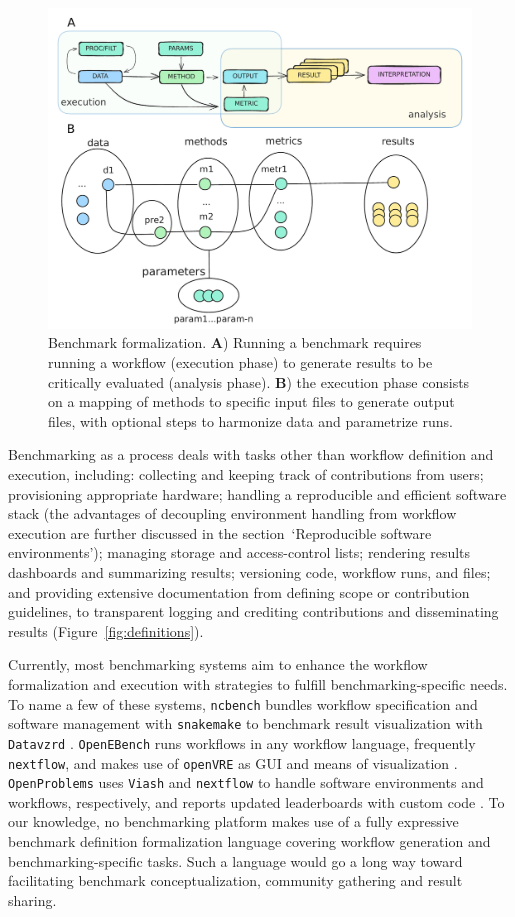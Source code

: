 \documentclass[11pt]{article}
\begin{document}
\begin{figure}
    \centering
    \includegraphics[width=0.75\linewidth]{./figures/fig3_bens_formalization_arrows.pdf} %
    \caption[Benchmark formalization.]{Benchmark formalization. \textbf{A}) Running a benchmark requires running a workflow (execution phase) to generate results to be critically evaluated (analysis phase). \textbf{B}) the execution phase consists on a mapping of methods to specific input files to generate output files, with optional steps to harmonize data and parametrize runs.}
    \label{fig:formalization}
\end{figure}

Benchmarking as a process deals with tasks other than workflow definition and execution, including: collecting and keeping track of contributions from users; provisioning appropriate hardware; handling a reproducible and efficient software stack (the advantages of decoupling environment handling from workflow execution are further discussed in the section~`Reproducible software environments'); managing storage and access-control lists; rendering results dashboards and summarizing results; versioning code, workflow runs, and files; and providing extensive documentation from defining scope or contribution guidelines, to transparent logging and crediting contributions and disseminating results (Figure~\ref{fig:definitions}).

Currently, most benchmarking systems aim to enhance the workflow formalization and execution with strategies to fulfill benchmarking-specific needs. To name a few of these systems, \texttt{ncbench} bundles workflow specification and software management with \texttt{snakemake} to benchmark result visualization with \texttt{Datavzrd} \cite{Hanssen2023-uf}. \texttt{OpenEBench} runs workflows in any workflow language, frequently \texttt{nextflow}, and makes use of \texttt{openVRE} as GUI and means of visualization \cite{Capella-Gutierrez2017-dh}. \texttt{OpenProblems} uses \texttt{Viash} and \texttt{nextflow} to handle software environments and workflows, respectively, and reports updated leaderboards with custom code \cite{Luecken2024-fk}. To our knowledge, no benchmarking platform makes use of a fully expressive benchmark definition formalization language covering workflow generation and benchmarking-specific tasks. Such a language would go a long way toward facilitating benchmark conceptualization, community gathering and result sharing.
\end{document}
